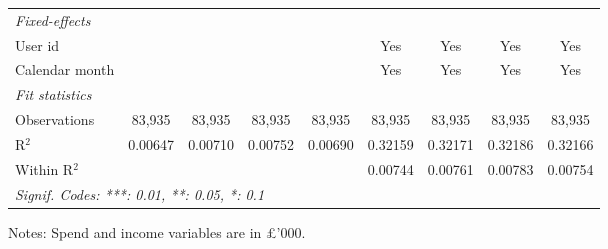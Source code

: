 \begin{table}[htbp]
\begin{threeparttable}[b]
\begin{tabular}{lcccccccc}
         \midrule
         \emph{Fixed-effects}\\
         User id                     &                   &                    &                    &                   & Yes                 & Yes                 & Yes                 & Yes\\  
         Calendar month              &                   &                    &                    &                   & Yes                 & Yes                 & Yes                 & Yes\\  
         \midrule
         \emph{Fit statistics}\\
         Observations                & 83,935            & 83,935             & 83,935             & 83,935            & 83,935              & 83,935              & 83,935              & 83,935\\  
         R$^2$                       & 0.00647           & 0.00710            & 0.00752            & 0.00690           & 0.32159             & 0.32171             & 0.32186             & 0.32166\\  
         Within R$^2$                &                   &                    &                    &                   & 0.00744             & 0.00761             & 0.00783             & 0.00754\\  
         \midrule \midrule
         \multicolumn{9}{l}{\emph{Signif. Codes: ***: 0.01, **: 0.05, *: 0.1}}\\
      \end{tabular}
      
      \begin{tablenotes}\footnotesize
         \item Notes: Spend and income variables are in \pounds'000.
      \end{tablenotes}
   \end{threeparttable}
\end{table}


